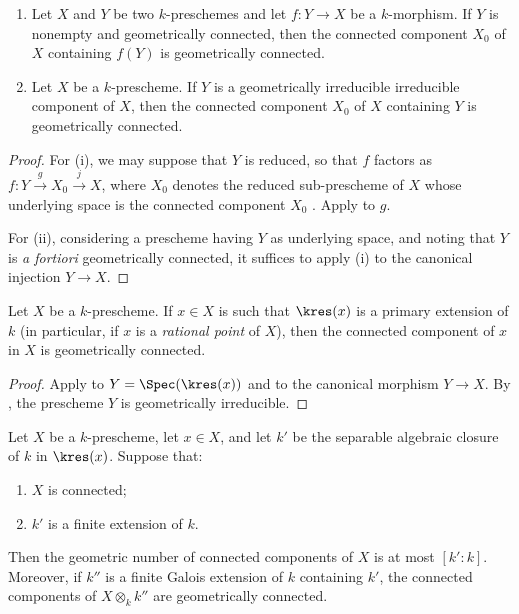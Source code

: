 \begin{corollary}[4.5.13.1]
\label{IV.4.5.13.1}
\begin{enumerate}
\item[\rm(i)]
\label{IV.4.5.13.1.i}
Let $X$ and $Y$ be two $k$-preschemes and let $f:Y\to X$ be a
$k$-morphism.
If $Y$ is nonempty and geometrically connected, then the connected
component $X_0$ of $X$ containing $f(Y)$ is geometrically connected.

\item[\rm(ii)]
\label{IV.4.5.13.1.ii}
Let $X$ be a $k$-prescheme.
If $Y$ is a geometrically irreducible irreducible component of $X$,
then the connected component $X_0$ of $X$ containing $Y$ is
geometrically connected.
\end{enumerate}
\end{corollary}

\begin{proof}
For (i), we may suppose that $Y$ is reduced, so that $f$ factors as $f:Y\xrightarrow{g}X_0\xrightarrow{j}X$,
where $X_0$ denotes the reduced sub-prescheme of $X$ whose underlying
space is the connected component $X_0$ .
Apply  to $g$.

For (ii), considering a prescheme having $Y$ as underlying space, and
noting that $Y$ is \emph{a fortiori} geometrically connected, it suffices
to apply (i) to the canonical injection $Y\to X$.
\end{proof}


\begin{corollary}[4.5.14]
\label{IV.4.5.14}
Let $X$ be a $k$-prescheme.
If $x\in X$ is such that $\kres(x)$ is a primary extension of $k$
\textup{(in particular, if $x$ is a \emph{rational point} of $X$)}, then the
connected component of $x$ in $X$ is geometrically connected.
\end{corollary}

\begin{proof}
Apply  to
$Y=\Spec(\kres(x))$ and to the canonical morphism $Y\to X$.
By , the prescheme $Y$ is geometrically irreducible.
\end{proof}

\begin{proposition}[4.5.15]
\label{IV.4.5.15}
Let $X$ be a $k$-prescheme, let $x\in X$, and let $k'$ be the
separable algebraic closure of $k$ in $\kres(x)$.
Suppose that:
\begin{enumerate}
\item[\rm(i)]
\label{IV.4.5.15.i}
$X$ is connected;

\item[\rm(ii)]
\label{IV.4.5.15.ii}
$k'$ is a finite extension of $k$.
\end{enumerate}
Then the geometric number of connected components of $X$ is at most
$[k':k]$.
Moreover, if $k''$ is a finite Galois extension of $k$ containing
$k'$, the connected components of $X\otimes_k k''$ are geometrically
connected.
\end{proposition}

